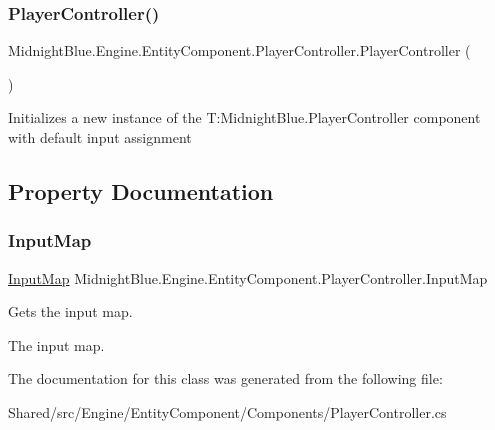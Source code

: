 \subsubsection{\texorpdfstring{Player\+Controller()}{PlayerController()}}
{\footnotesize\ttfamily Midnight\+Blue.\+Engine.\+Entity\+Component.\+Player\+Controller.\+Player\+Controller (\begin{DoxyParamCaption}{ }\end{DoxyParamCaption})\hspace{0.3cm}{\ttfamily [inline]}}



Initializes a new instance of the T\+:\+Midnight\+Blue.\+Player\+Controller component with default input assignment 



\subsection{Property Documentation}
\hypertarget{class_midnight_blue_1_1_engine_1_1_entity_component_1_1_player_controller_ad577945f15d3e6b4c1282493cc53b6d9}{}\label{class_midnight_blue_1_1_engine_1_1_entity_component_1_1_player_controller_ad577945f15d3e6b4c1282493cc53b6d9} 
\subsubsection{\texorpdfstring{Input\+Map}{InputMap}}
{\footnotesize\ttfamily \hyperlink{class_midnight_blue_1_1_engine_1_1_i_o_1_1_input_map}{Input\+Map} Midnight\+Blue.\+Engine.\+Entity\+Component.\+Player\+Controller.\+Input\+Map\hspace{0.3cm}{\ttfamily [get]}}



Gets the input map. 

The input map.

The documentation for this class was generated from the following file\+:\begin{DoxyCompactItemize}
\item 
Shared/src/\+Engine/\+Entity\+Component/\+Components/Player\+Controller.\+cs\end{DoxyCompactItemize}
